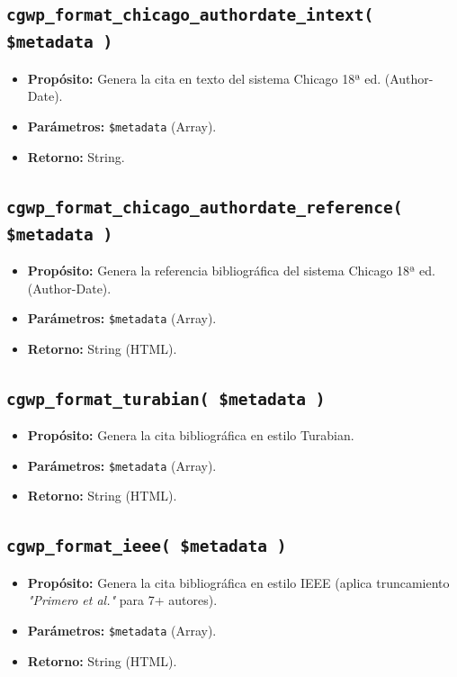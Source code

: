\documentclass[11pt, a4paper]{article}
\begin{document}
\subsection{\texttt{cgwp\_format\_chicago\_authordate\_intext( \$metadata )}}
\begin{itemize}
\item \textbf{Propósito:} Genera la cita en texto del sistema Chicago 18ª ed. (Author-Date).
\item \textbf{Parámetros:} \texttt{\$metadata} (Array).
\item \textbf{Retorno:} String.
\end{itemize}
\subsection{\texttt{cgwp\_format\_chicago\_authordate\_reference( \$metadata )}}
\begin{itemize}
\item \textbf{Propósito:} Genera la referencia bibliográfica del sistema Chicago 18ª ed. (Author-Date).
\item \textbf{Parámetros:} \texttt{\$metadata} (Array).
\item \textbf{Retorno:} String (HTML).
\end{itemize}
\subsection{\texttt{cgwp\_format\_turabian( \$metadata )}}
\begin{itemize}
\item \textbf{Propósito:} Genera la cita bibliográfica en estilo Turabian.
\item \textbf{Parámetros:} \texttt{\$metadata} (Array).
\item \textbf{Retorno:} String (HTML).
\end{itemize}
\subsection{\texttt{cgwp\_format\_ieee( \$metadata )}}
\begin{itemize}
\item \textbf{Propósito:} Genera la cita bibliográfica en estilo IEEE (aplica truncamiento \textit{"Primero et al."} para 7+ autores).
\item \textbf{Parámetros:} \texttt{\$metadata} (Array).
\item \textbf{Retorno:} String (HTML).
\end{itemize}
\end{document}
